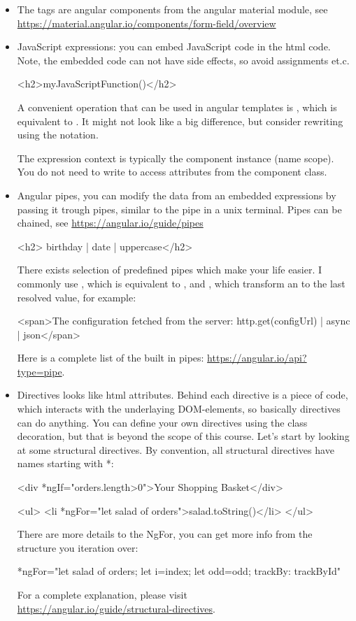 \begin{itemize}
\item The  tags are angular components from the angular material module, see \url{https://material.angular.io/components/form-field/overview}
\item JavaScript expressions: you can embed JavaScript code in the html code. Note, the embedded code can not have side effects, so avoid assignments \code{+=, ++} et.c.
\begin{Code}
<h2>{{myJavaScriptFunction()}}</h2>
\end{Code}
A convenient operation that can be used in angular templates is , which is equivalent to . It might not look like a big difference, but consider rewriting  using the  notation.

The expression context is typically the component instance (name scope). You do not need to write  to access attributes from the component class.
\item Angular pipes, you can modify the data from an embedded expressions by passing it trough pipes, similar to the pipe in a unix terminal. Pipes can be chained, see \url{https://angular.io/guide/pipes}
\begin{Code}
<h2>{{ birthday | date | uppercase}}</h2>
\end{Code}
There exists selection of predefined pipes which make your life easier. I commonly use , which is equivalent to , and , which transform an  to the last resolved value, for example:
\begin{Code}
<span>The configuration fetched from the server: 
{{ http.get(configUrl) | async | json}}</span>
\end{Code}
Here is a complete list of the built in pipes: \url{https://angular.io/api?type=pipe}.
\item Directives looks like html attributes. Behind each directive is a piece of code, which interacts with the underlaying DOM-elements, so basically directives can do anything. You can define your own directives using the  class decoration, but that is beyond the scope of this course. Let's start by looking at some structural directives. By convention, all structural directives have names starting with *:
\begin{Code}
<div *ngIf="orders.length>0">Your Shopping Basket</div>

<ul>
  <li *ngFor="let salad of orders">{{salad.toString()}}</li>
</ul>
\end{Code}
There are more details to the NgFor, you can get more info from the structure you iteration over: 
\begin{Code}
*ngFor="let salad of orders; let i=index; let odd=odd; trackBy: trackById"
\end{Code}
For a complete explanation, please visit \\ \url{https://angular.io/guide/structural-directives}.


\end{itemize}
